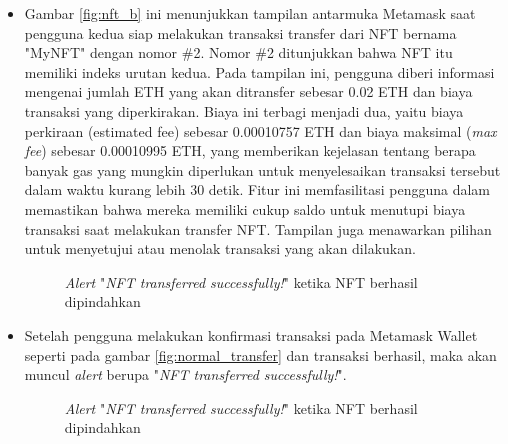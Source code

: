 \begin{itemize}
  \item Gambar \ref*{fig:nft_b} ini menunjukkan tampilan antarmuka Metamask saat pengguna kedua siap melakukan transaksi transfer dari NFT bernama "MyNFT" dengan nomor \#2. Nomor \#2 ditunjukkan bahwa NFT itu memiliki indeks urutan kedua. Pada tampilan ini, pengguna diberi informasi mengenai jumlah ETH yang akan ditransfer sebesar 0.02 ETH dan biaya transaksi yang diperkirakan. Biaya ini terbagi menjadi dua, yaitu biaya perkiraan (estimated fee) sebesar 0.00010757 ETH dan biaya maksimal (\emph{max fee}) sebesar 0.00010995 ETH, yang memberikan kejelasan tentang berapa banyak gas yang mungkin diperlukan untuk menyelesaikan transaksi tersebut dalam waktu kurang lebih 30 detik. Fitur ini memfasilitasi pengguna dalam memastikan bahwa mereka memiliki cukup saldo untuk menutupi biaya transaksi saat melakukan transfer NFT. Tampilan juga menawarkan pilihan untuk menyetujui atau menolak transaksi yang akan dilakukan.
  
  \begin{figure} [H] \centering
  \caption{\emph{Alert} "\emph{NFT transferred successfully!}" ketika NFT berhasil dipindahkan}
  \label{fig:alert}
  \end{figure}

  \item Setelah pengguna melakukan konfirmasi transaksi pada Metamask Wallet seperti pada gambar \ref*{fig:normal_transfer} dan transaksi berhasil, maka akan muncul \emph{alert} berupa "\emph{NFT transferred successfully!}".
  
  \begin{figure} [H] \centering
    \caption{\emph{Alert} "\emph{NFT transferred successfully!}" ketika NFT berhasil dipindahkan}
    \label{fig:letter_b_akun3}
    \end{figure}


\end{itemize}
